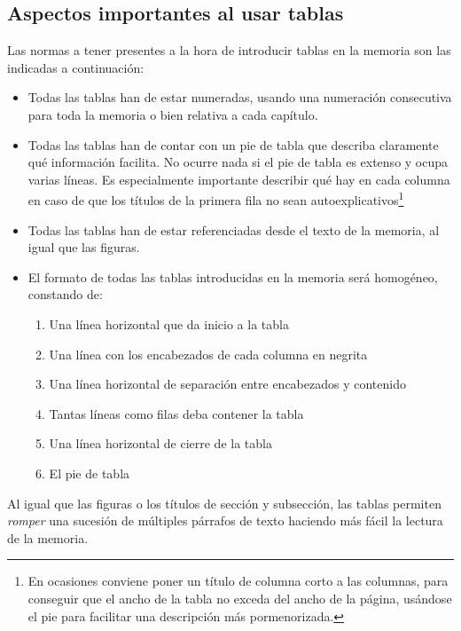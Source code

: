 \subsection{Aspectos importantes al usar tablas}

Las normas a tener presentes a la hora de introducir tablas en la memoria son las indicadas a continuación:

\begin{itemize}
    \item Todas las tablas han de estar numeradas, usando una numeración consecutiva para toda la memoria o bien relativa a cada capítulo.
    
    \item Todas las tablas han de contar con un pie de tabla que describa claramente qué información facilita. No ocurre nada si el pie de tabla es extenso y ocupa varias líneas. Es especialmente importante describir qué hay en cada columna en caso de que los títulos de la primera fila no sean autoexplicativos\footnote{En ocasiones conviene poner un título de columna corto a las columnas, para conseguir que el ancho de la tabla no exceda del ancho de la página, usándose el pie para facilitar una descripción más pormenorizada.}
    
    \item Todas las tablas han de estar referenciadas desde el texto de la memoria, al igual que las figuras.
    
    \item El formato de todas las tablas introducidas en la memoria será homogéneo, constando de:
    \begin{enumerate}
        \item Una línea horizontal que da inicio a la tabla
        \item Una línea con los encabezados de cada columna en negrita
        \item Una línea horizontal de separación entre encabezados y contenido
        \item Tantas líneas como filas deba contener la tabla
        \item Una línea horizontal de cierre de la tabla
        \item El pie de tabla
    \end{enumerate}
\end{itemize}

Al igual que las figuras o los títulos de sección y subsección, las tablas permiten \textit{romper} una sucesión de múltiples párrafos de texto haciendo más fácil la lectura de la memoria.

